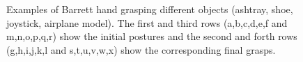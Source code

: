 \begin{figure}

  \caption{\scriptsize{Examples of Barrett hand grasping different objects (ashtray, shoe, joystick, airplane model). The first and third rows (a,b,c,d,e,f and m,n,o,p,q,r) show the initial postures and the second and forth rows (g,h,i,j,k,l and s,t,u,v,w,x) show the corresponding final grasps.}
}
    \label{barrett}
\end{figure}

